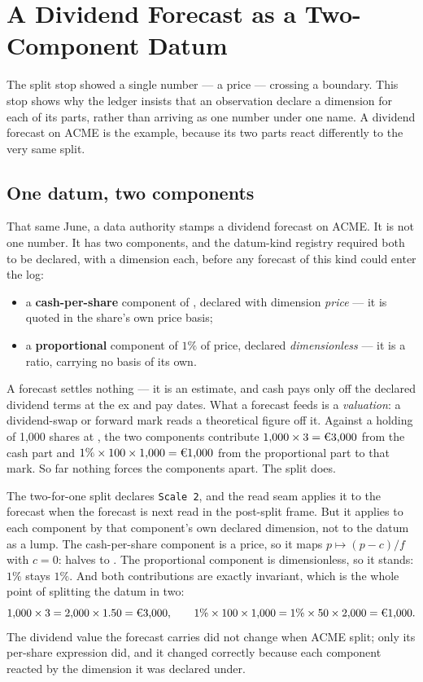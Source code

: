 \section{A Dividend Forecast as a Two-Component Datum}\label{sec:tour-forecast}

The split stop showed a single number --- a price --- crossing a boundary. This stop
shows why the ledger insists that an observation declare a dimension for each of its
parts, rather than arriving as one number under one name. A dividend forecast on ACME
is the example, because its two parts react differently to the very same split.

\subsection{One datum, two components}

That same June, a data authority stamps a dividend forecast on ACME. It is not one
number. It has two components, and the datum-kind registry required both to be
declared, with a dimension each, before any forecast of this kind could enter the
log:

\begin{itemize}[leftmargin=1.5em]
\item a \textbf{cash-per-share} component of , declared with dimension
\emph{price} --- it is quoted in the share's own price basis;
\item a \textbf{proportional} component of $1\%$ of price, declared
\emph{dimensionless} --- it is a ratio, carrying no basis of its own.
\end{itemize}

A forecast settles nothing --- it is an estimate, and cash pays only off the declared
dividend terms at the ex and pay dates. What a forecast feeds is a \emph{valuation}: a
dividend-swap or forward mark reads a theoretical figure off it. Against a holding of
1{,}000 shares at , the two components contribute
$1{,}000 \times 3 = \EUR{3{,}000}$ from the cash part and
$1\% \times 100 \times 1{,}000 = \EUR{1{,}000}$ from the proportional part to that
mark. So far nothing forces the components apart. The split does.

The two-for-one split declares \texttt{Scale 2}, and the read seam applies it to the
forecast when the forecast is next read in the post-split frame. But it applies to
each component by that component's own declared dimension, not to the datum as a
lump. The cash-per-share component is a price, so it maps $p \mapsto (p - c)/f$ with
$c = 0$:  halves to . The proportional component is
dimensionless, so it stands: $1\%$ stays $1\%$. And both contributions are exactly
invariant, which is the whole point of splitting the datum in two:
\[
  1{,}000 \times 3 = 2{,}000 \times 1.50 = \EUR{3{,}000}, \qquad
  1\% \times 100 \times 1{,}000 = 1\% \times 50 \times 2{,}000 = \EUR{1{,}000}.
\]
The dividend value the forecast carries did not change when ACME split; only its
per-share expression did, and it changed correctly because each component reacted by
the dimension it was declared under.

